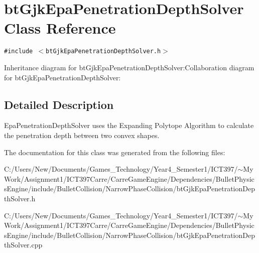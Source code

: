 \hypertarget{classbt_gjk_epa_penetration_depth_solver}{
\section{btGjkEpaPenetrationDepthSolver Class Reference}
\label{classbt_gjk_epa_penetration_depth_solver}
}
{\tt \#include $<$btGjkEpaPenetrationDepthSolver.h$>$}

Inheritance diagram for btGjkEpaPenetrationDepthSolver:Collaboration diagram for btGjkEpaPenetrationDepthSolver:

\subsection{Detailed Description}
EpaPenetrationDepthSolver uses the Expanding Polytope Algorithm to calculate the penetration depth between two convex shapes. 

The documentation for this class was generated from the following files:\begin{CompactItemize}
\item 
C:/Users/New/Documents/Games\_\-Technology/Year4\_\-Semester1/ICT397/$\sim$My Work/Assignment1/ICT397Carre/CarreGameEngine/Dependencies/BulletPhysicsEngine/include/BulletCollision/NarrowPhaseCollision/btGjkEpaPenetrationDepthSolver.h\item 
C:/Users/New/Documents/Games\_\-Technology/Year4\_\-Semester1/ICT397/$\sim$My Work/Assignment1/ICT397Carre/CarreGameEngine/Dependencies/BulletPhysicsEngine/include/BulletCollision/NarrowPhaseCollision/btGjkEpaPenetrationDepthSolver.cpp\end{CompactItemize}
